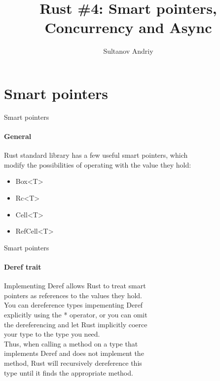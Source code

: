 \documentclass[usenames,dvipsnames,10pt,aspectratio=169]{beamer}
\title[Rust \#4]{Rust \#4: Smart pointers,\\ \vspace{0.1cm}Concurrency and Async}
\author[Sultanov Andriy]{Sultanov Andriy}
\institute{APPS@UCU}
\begin{document}
\begin{frame}
\titlepage
\end{frame}

\begin{frame}{\contentsname}
\tableofcontents
\end{frame}


\section{Smart pointers}

\begin{frame}{Smart pointers}
	\framesubtitle{General}
\large	
Rust standard library has a few useful smart pointers, which\\
modify the possibilities of operating with the value they hold:\\
\vspace{0.4cm}
\begin{itemize}[label=$\bullet$]
	\item \textcolor{ucuyellow}{Box<T>}
	\item \textcolor{ucuyellow}{Rc<T>}
	\item \textcolor{ucuyellow}{Cell<T>}
	\item \textcolor{ucuyellow}{RefCell<T>}
\end{itemize}
\end{frame}

\begin{frame}{Smart pointers}
	\framesubtitle{Deref trait}
	\large
Implementing \textcolor{ucuyellow}{Deref} allows Rust to treat smart\\
pointers as references to the values they hold.\\
\vspace{0.4cm}
You can dereference types impementing \textcolor{ucuyellow}{Deref}\\
explicitly using the \textcolor{ucuyellow}{*} operator, or you can omit\\
the dereferencing and let Rust implicitly coerce\\
your type to the type you need.\\
\vspace{0.4cm}
Thus, when calling a method on a type that\\
implements \textcolor{ucuyellow}{Deref} and does not implement the\\
method, Rust will recursively dereference this\\
type until it finds the appropriate method.
\end{frame}
\end{document}

